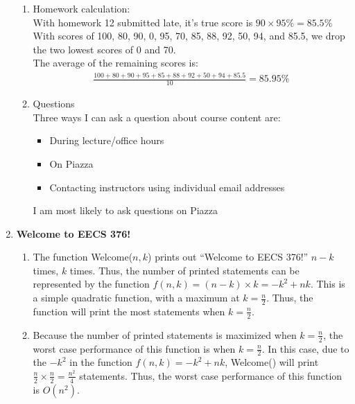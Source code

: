 \documentclass{article}
\begin{document}
\begin{enumerate}
\begin {enumerate}
        \item Homework calculation: \\
        With homework 12 submitted late, it's true score is $90 \times 95\% = 85.5\%$ \\
        With scores of 100, 80, 90, 0, 95, 70, 85, 88, 92, 50, 94, and 85.5, we drop the two lowest scores of 0 and 70. \\
        The average of the remaining scores is:\\
        \begin{align*}
            \frac{100 + 80 + 90 + 95 + 85 + 88 + 92 + 50 + 94 + 85.5}{10} = 85.95\%
        \end{align*}



        \item Questions \\
        Three ways I can ask a question about course content are:
        \begin{itemize}
            \item During lecture/office hours
            \item On Piazza
            \item Contacting instructors using individual email addresses
        \end{itemize}
        I am most likely to ask questions on Piazza
    \end{enumerate}
    


    \item \textbf{Welcome to EECS 376!}
    \begin{enumerate}
        \item The function Welcome($n, k$) prints out ``Welcome to EECS 376!'' $n-k$ times, $k$ times. Thus, the number of printed statements can be represented by the function $f(n, k) = (n-k)\times k = -k^2+nk$. This is a simple quadratic function, with a maximum at $k = \frac{n}{2}$. Thus, the function will print the most statements when $k = \frac{n}{2}$.
    
    
        
        \item Because the number of printed statements is maximized when $k = \frac{n}{2}$, the worst case performance of this function is when $k = \frac{n}{2}$. In this case, due to the $-k^2$ in the function $f(n, k) = -k^2+nk$, Welcome() will print $\frac{n}{2} \times \frac{n}{2} = \frac{n^2}{4}$ statements. Thus, the worst case performance of this function is $O(n^2)$.
    

\end{enumerate}
\end{enumerate}
\end{document}
